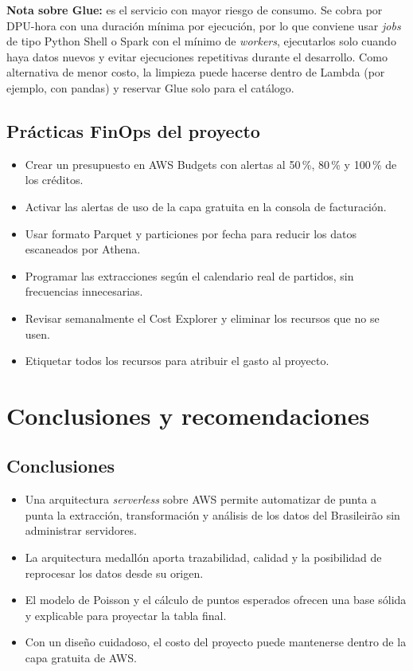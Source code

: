 \documentclass[11pt,a4paper]{article}
\begin{document}
\noindent\textbf{Nota sobre Glue:} es el servicio con mayor riesgo de consumo. Se cobra por DPU-hora con una duración mínima por ejecución, por lo que conviene usar \textit{jobs} de tipo Python Shell o Spark con el mínimo de \textit{workers}, ejecutarlos solo cuando haya datos nuevos y evitar ejecuciones repetitivas durante el desarrollo. Como alternativa de menor costo, la limpieza puede hacerse dentro de Lambda (por ejemplo, con pandas) y reservar Glue solo para el catálogo.

\subsection{Prácticas FinOps del proyecto}
\begin{itemize}
  \item Crear un presupuesto en AWS Budgets con alertas al 50\,\%, 80\,\% y 100\,\% de los créditos.
  \item Activar las alertas de uso de la capa gratuita en la consola de facturación.
  \item Usar formato Parquet y particiones por fecha para reducir los datos escaneados por Athena.
  \item Programar las extracciones según el calendario real de partidos, sin frecuencias innecesarias.
  \item Revisar semanalmente el Cost Explorer y eliminar los recursos que no se usen.
  \item Etiquetar todos los recursos para atribuir el gasto al proyecto.
\end{itemize}

\section{Conclusiones y recomendaciones}

\subsection{Conclusiones}
\begin{itemize}
  \item Una arquitectura \textit{serverless} sobre AWS permite automatizar de punta a punta la extracción, transformación y análisis de los datos del Brasileirão sin administrar servidores.
  \item La arquitectura medallón aporta trazabilidad, calidad y la posibilidad de reprocesar los datos desde su origen.
  \item El modelo de Poisson y el cálculo de puntos esperados ofrecen una base sólida y explicable para proyectar la tabla final.
  \item Con un diseño cuidadoso, el costo del proyecto puede mantenerse dentro de la capa gratuita de AWS.
\end{itemize}
\end{document}

